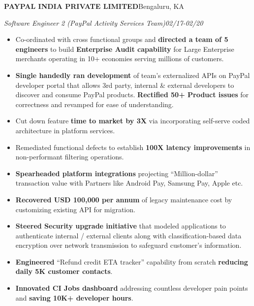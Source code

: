 \documentclass[10pt,letterpaper]{article}
\newlength{\entrygap}      \setlength{\entrygap}{8pt}
\newcommand{\bd}[1]{\textbf{#1}}
\newcommand{\entry}[4]{%
  \par\vspace{\entrygap}%
  \noindent\textbf{#1}\hfill #2\par
  \noindent\textcolor{rolecolor}{\textit{#3}}\hfill\textcolor{rolecolor}{\textit{#4}}\par
  \nopagebreak}
\begin{document}
\entry{PAYPAL INDIA PRIVATE LIMITED}{Bengaluru, KA}
      {Software Engineer 2 (PayPal Activity Services Team)}{02/17-02/20}
\begin{itemize}
\item Co-ordinated with cross functional groups and \bd{directed a team of 5 engineers} to
  build \bd{Enterprise Audit capability} for Large Enterprise merchants operating in 10+
  economies serving millions of customers.
\item \bd{Single handedly ran development} of team's externalized APIs on PayPal developer
  portal that allows 3rd party, internal \& external developers to discover and consume
  PayPal products. \bd{Rectified 50+ Product issues} for correctness and revamped for ease
  of understanding.
\item Cut down feature \bd{time to market by 3X} via incorporating self-serve coded
  architecture in platform services.
\item Remediated functional defects to establish \bd{100X latency improvements} in
  non-performant filtering operations.
\item \bd{Spearheaded platform integrations} projecting ``Million-dollar'' transaction value
  with Partners like Android Pay, Samsung Pay, Apple etc.
\item \bd{Recovered USD 100,000 per annum} of legacy maintenance cost by customizing
  existing API for migration.
\item \bd{Steered Security upgrade initiative} that modeled applications to authenticate
  internal / external clients along with classification-based data encryption over network
  transmission to safeguard customer's information.
\item \bd{Engineered} ``Refund credit ETA tracker'' capability from scratch \bd{reducing
  daily 5K customer contacts}.
\item \bd{Innovated CI Jobs dashboard} addressing countless developer pain points and
  \bd{saving 10K+ developer hours}.
\end{itemize}
\end{document}
